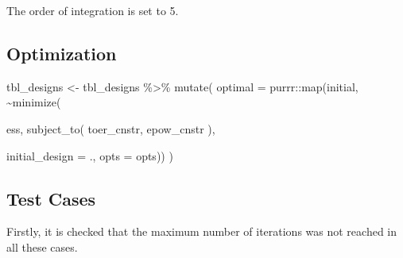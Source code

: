 \documentclass[
]{book}
\newenvironment{Shaded}{\begin{snugshade}}{\end{snugshade}}
\newcommand{\AttributeTok}[1]{\textcolor[rgb]{0.77,0.63,0.00}{#1}}
\newcommand{\FunctionTok}[1]{\textcolor[rgb]{0.00,0.00,0.00}{#1}}
\newcommand{\NormalTok}[1]{#1}
\newcommand{\OtherTok}[1]{\textcolor[rgb]{0.56,0.35,0.01}{#1}}
\newcommand{\SpecialCharTok}[1]{\textcolor[rgb]{0.00,0.00,0.00}{#1}}
\begin{document}
The order of integration is set to 5.

\hypertarget{optimization-16}{%
\subsection{Optimization}\label{optimization-16}}

\begin{Shaded}
\begin{Highlighting}[]
\NormalTok{tbl\_designs }\OtherTok{\textless{}{-}}\NormalTok{ tbl\_designs }\SpecialCharTok{\%\textgreater{}\%} 
    \FunctionTok{mutate}\NormalTok{(}
       \AttributeTok{optimal =}\NormalTok{ purrr}\SpecialCharTok{::}\FunctionTok{map}\NormalTok{(initial, }\SpecialCharTok{\textasciitilde{}}\FunctionTok{minimize}\NormalTok{(}
         
\NormalTok{          ess,}
          \FunctionTok{subject\_to}\NormalTok{(}
\NormalTok{              toer\_cnstr,}
\NormalTok{              epow\_cnstr}
\NormalTok{          ),}
          
          \AttributeTok{initial\_design =}\NormalTok{ ., }
          \AttributeTok{opts           =}\NormalTok{ opts)) )}
\end{Highlighting}
\end{Shaded}

\hypertarget{test-cases-18}{%
\subsection{Test Cases}\label{test-cases-18}}

Firstly, it is checked that the maximum number of iterations was not reached in all these cases.

\begin{Shaded}
\end{Shaded}
\end{document}
